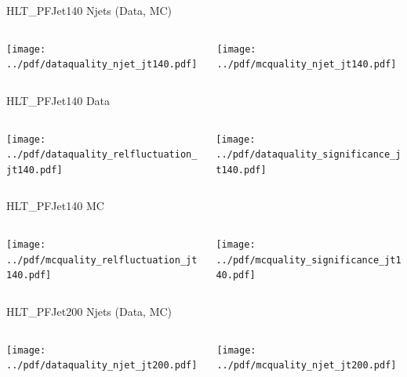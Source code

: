 \documentclass[9pt]{beamer}
\begin{document}
\begin{frame}[t]{HLT\_PFJet140 Njets (Data, MC)}
\begin{columns}[T]
  \begin{column}{.5\textwidth}
  \texttt{[image: ../pdf/dataquality\_njet\_jt140.pdf]}
  \end{column}
  \begin{column}{.5\textwidth}
  \texttt{[image: ../pdf/mcquality\_njet\_jt140.pdf]}
  \end{column}
\end{columns}
\end{frame}

\begin{frame}[t]{HLT\_PFJet140 Data}
\begin{columns}[T]
  \begin{column}{.5\textwidth}
  \texttt{[image: ../pdf/dataquality\_relfluctuation\_jt140.pdf]}
  \end{column}
  \begin{column}{.5\textwidth}
  \texttt{[image: ../pdf/dataquality\_significance\_jt140.pdf]}
  \end{column}
\end{columns}
\end{frame}

\begin{frame}[t]{HLT\_PFJet140 MC}
\begin{columns}[T]
  \begin{column}{.5\textwidth}
  \texttt{[image: ../pdf/mcquality\_relfluctuation\_jt140.pdf]}
  \end{column}
  \begin{column}{.5\textwidth}
  \texttt{[image: ../pdf/mcquality\_significance\_jt140.pdf]}
  \end{column}
\end{columns}
\end{frame}

\begin{frame}[t]{HLT\_PFJet200 Njets (Data, MC)}
\begin{columns}[T]
  \begin{column}{.5\textwidth}
  \texttt{[image: ../pdf/dataquality\_njet\_jt200.pdf]}
  \end{column}
  \begin{column}{.5\textwidth}
  \texttt{[image: ../pdf/mcquality\_njet\_jt200.pdf]}
  \end{column}
\end{columns}
\end{frame}
\end{document}
